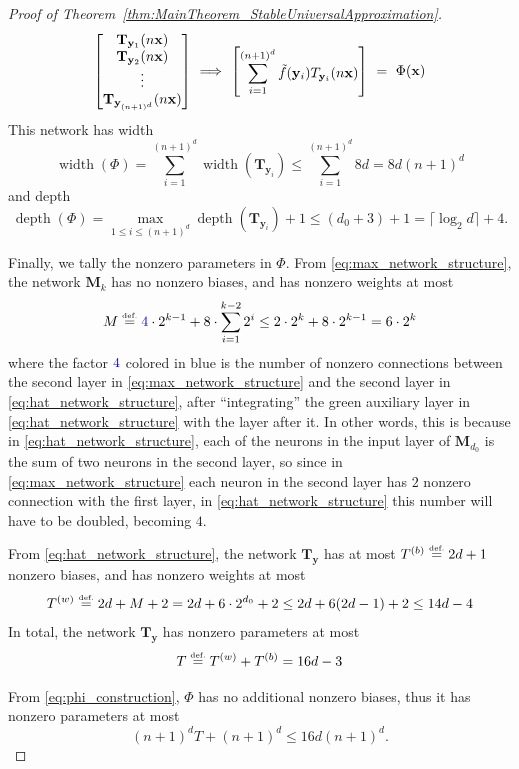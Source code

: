 \documentclass{article}
\numberwithin{equation}{section}
\theoremstyle{definition}
\newcommand{\eqdef}{\ensuremath{\stackrel{\mbox{\upshape\tiny def.}}{=}}}
\begin{document}
\begin{proof}[{Proof of Theorem~\ref{thm:MainTheorem_StableUniversalApproximation}}]
\begin{align}
    \begin{bmatrix} 
    \mathbf{T}_{\mathbf{y}_1}(n\mathbf{x})
    \\ 
    \mathbf{T}_{\mathbf{y}_2}(n\mathbf{x})
    \\
    \vdots
    \\
    \mathbf{T}_{\mathbf{y}_{(n+1)^d}}(n\mathbf{x})
    \end{bmatrix}
    \ \Longrightarrow \
    \begin{bmatrix} 
    \displaystyle
    \sum_{i=1}^{(n+1)^d}
    \Tilde{f}(\mathbf{y}_i)
    T_{\mathbf{y}_i}(n\mathbf{x})
    \end{bmatrix}
    \ = \
    \Phi(\mathbf{x})
\end{align}
This network has width
$$\operatorname{width}(\Phi)
= \sum_{i=1}^{(n+1)^d} \operatorname{width}(\mathbf{T}_{\mathbf{y}_i})
\le \sum_{i=1}^{(n+1)^d} 8d 
= 8d(n+1)^d$$
and depth
$$\operatorname{depth}(\Phi)
= \max\limits_{1\le i\le (n+1)^d} 
  \operatorname{depth}(\mathbf{T}_{\mathbf{y}_i}) + 1
\le (d_0 + 3) + 1
= \lceil \log_2{d} \rceil + 4.$$

Finally, we tally the nonzero parameters in $\Phi$. From \eqref{eq:max_network_structure}, the network $\mathbf{M}_k$ has no nonzero biases, and has nonzero weights at most 
\[
    M 
    \eqdef
    {\color{blue}4} \cdot 2^{k-1}
    +
    8 \cdot 
    \sum_{i=1}^{k-2} 2^i
    \le
    2 \cdot 2^k + 8 \cdot 2^{k-1}
    =
    6 \cdot 2^k
\]
where the factor ${\color{blue}4}$ colored in blue is the number of nonzero connections between the second layer in \eqref{eq:max_network_structure} and the second layer in \eqref{eq:hat_network_structure}, after ``integrating'' the green auxiliary layer in \eqref{eq:hat_network_structure} with the layer after it. In other words, this is because in \eqref{eq:hat_network_structure}, each of the neurons in the input layer of $\mathbf{M}_{d_0}$ is the sum of two neurons in the second layer, so since in \eqref{eq:max_network_structure} each neuron in the second layer has $2$ nonzero connection with the first layer, in \eqref{eq:hat_network_structure} this number will have to be doubled, becoming $4$. 

From \eqref{eq:hat_network_structure}, the network $\mathbf{T}_{\mathbf{y}}$ has at most $T^{(b)} \eqdef 2d+1$ nonzero biases, and has nonzero weights at most 
\[
    T^{(w)} 
    \eqdef 
    2d + M + 2
    =
    2d + 6 \cdot 2^{d_0} + 2
    \le
    2d + 6 (2d-1) + 2
    \le
    14d - 4
\]
In total, the network $\mathbf{T}_{\mathbf{y}}$ has nonzero parameters at most
\begin{equation}
\label{eq:hat_par_bound}
    T \eqdef T^{(w)} + T^{(b)} = 16d - 3
\end{equation}

From \eqref{eq:phi_construction}, $\Phi$ has no additional nonzero biases, thus it has nonzero parameters at most
\begin{equation}
\label{eq:total_parameters}
    (n+1)^d T + (n+1)^d \le 16d (n+1)^d.
\end{equation}
\end{proof}
\end{document}

